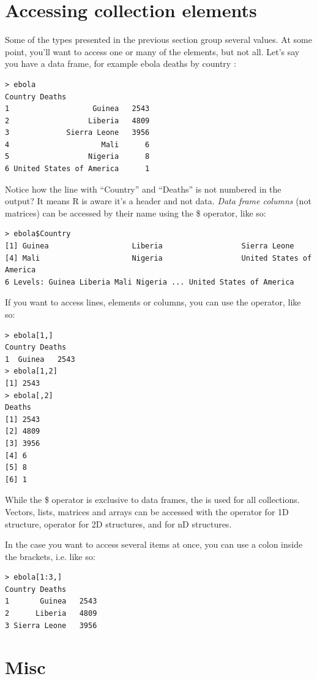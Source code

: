 \documentclass{report}
\newcommand{\code}[1]{\textsf{\ttfamily #1}}
\begin{document}
	\section{Accessing collection elements}\label{sec:access}
	Some of the types presented in the previous section group several values. At some point, you'll want to access one or many of the elements, but not all. Let's say you have a data frame, for example ebola deaths by country \cite{who}:
	\begin{verbatim}
> ebola
Country Deaths
1                   Guinea   2543
2                  Liberia   4809
3             Sierra Leone   3956
4                     Mali      6
5                  Nigeria      8
6 United States of America      1
	\end{verbatim}
	Notice how the line with ``Country'' and ``Deaths'' is not numbered in the output? It means R is aware it's a header and not data. \emph{Data frame columns} (not matrices) can be accessed by their name using the \code{\$} operator, like so:
	\begin{verbatim}
> ebola$Country
[1] Guinea                   Liberia                  Sierra Leone            
[4] Mali                     Nigeria                  United States of America
6 Levels: Guinea Liberia Mali Nigeria ... United States of America
	\end{verbatim}
	If you want to access lines, elements or columns, you can use the \code{[row, column]} operator, like so:
	\begin{verbatim}
> ebola[1,]
Country Deaths
1  Guinea   2543
> ebola[1,2]
[1] 2543
> ebola[,2]
Deaths
[1] 2543
[2] 4809
[3] 3956
[4] 6
[5] 8
[6] 1
	\end{verbatim}
	While the \code{\$} operator is exclusive to data frames, the \code{[]} is used for all collections. Vectors, lists, matrices and arrays can be accessed with the \code{[index]} operator for 1D structure, \code{[row, column]} operator for 2D structures, and \code{[i, j, k...]} for nD structures.

	In the case you want to access several items at once, you can use a colon inside the brackets, i.e. \code{[begin:end]} like so:
	\begin{verbatim}
> ebola[1:3,]
Country Deaths
1       Guinea   2543
2      Liberia   4809
3 Sierra Leone   3956
	\end{verbatim}
	
	\section{Misc}
\end{document}
